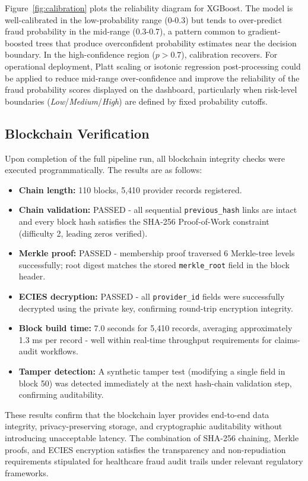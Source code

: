 Figure~\ref{fig:calibration} plots the reliability diagram for XGBoost.
The model is well-calibrated in the low-probability range (0-0.3)
but tends to over-predict fraud probability in the mid-range (0.3-0.7),
a pattern common to gradient-boosted trees that produce overconfident
probability estimates near the decision boundary. In the high-confidence
region ($p > 0.7$), calibration recovers. For operational deployment,
Platt scaling or isotonic regression post-processing could be applied
to reduce mid-range over-confidence and improve the reliability of the
fraud probability scores displayed on the dashboard, particularly when
risk-level boundaries (\textit{Low}/\textit{Medium}/\textit{High}) are
defined by fixed probability cutoffs.


\subsection{Blockchain Verification}
\label{sec:blockchain_verification}

Upon completion of the full pipeline run, all blockchain integrity
checks were executed programmatically. The results are as follows:

\begin{itemize}[nosep,leftmargin=1.5em]
  \item \textbf{Chain length:} 110 blocks, 5{,}410 provider records
        registered.
  \item \textbf{Chain validation:} PASSED - all sequential
        \texttt{previous\_hash} links are intact and every block hash
        satisfies the SHA-256 Proof-of-Work constraint (difficulty 2,
        leading zeros verified).
  \item \textbf{Merkle proof:} PASSED - membership proof traversed
        6 Merkle-tree levels successfully; root digest matches the
        stored \texttt{merkle\_root} field in the block header.
  \item \textbf{ECIES decryption:} PASSED - all \texttt{provider\_id}
        fields were successfully decrypted using the private key,
        confirming round-trip encryption integrity.
  \item \textbf{Block build time:} 7.0 seconds for 5{,}410 records,
        averaging approximately 1.3 ms per record - well within
        real-time throughput requirements for claims-audit workflows.
  \item \textbf{Tamper detection:} A synthetic tamper test (modifying
        a single field in block 50) was detected immediately at the
        next hash-chain validation step, confirming auditability.
\end{itemize}

These results confirm that the blockchain layer provides end-to-end
data integrity, privacy-preserving storage, and cryptographic
auditability without introducing unacceptable latency. The combination
of SHA-256 chaining, Merkle proofs, and ECIES encryption satisfies
the transparency and non-repudiation requirements stipulated for
healthcare fraud audit trails under relevant regulatory frameworks.
